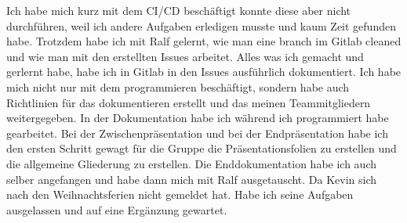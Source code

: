 Ich habe mich kurz mit dem CI/CD beschäftigt konnte diese aber nicht durchführen, weil ich andere Aufgaben erledigen musste und kaum Zeit gefunden habe.
Trotzdem habe ich mit Ralf gelernt, wie man eine branch im Gitlab cleaned und wie man mit den erstellten Issues arbeitet.
Alles was ich gemacht und gerlernt habe, habe ich in Gitlab in den Issues ausführlich dokumentiert. 
Ich habe mich nicht nur mit dem programmieren beschäftigt, sondern habe auch Richtlinien für das dokumentieren erstellt und das meinen Teammitgliedern weitergegeben. In der Dokumentation habe ich während ich programmiert habe gearbeitet.
Bei der Zwischenpräsentation und bei der Endpräsentation habe ich den ersten Schritt gewagt für die Gruppe die Präsentationsfolien zu erstellen und die allgemeine Gliederung zu erstellen.
Die Enddokumentation habe ich auch selber angefangen und habe dann mich mit Ralf ausgetauscht. Da Kevin sich nach den Weihnachtsferien nicht gemeldet hat. Habe ich seine Aufgaben ausgelassen und auf eine Ergänzung gewartet.\newline


